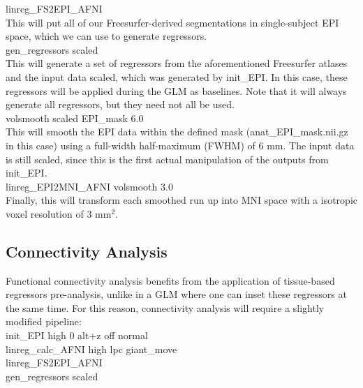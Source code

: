 \documentclass[final,titlepage,letterpaper,oneside,12pt]{article}
\renewcommand{\texttt}[2][BrickRed]{\textcolor{#1}{\ttfamily #2}}%
\begin{document}
\noindent
\texttt{linreg\_FS2EPI\_AFNI} \\

This will put all of our Freesurfer-derived segmentations in single-subject EPI space, which we can use to generate regressors. \\

\noindent
\texttt{gen\_regressors scaled} \\

This will generate a set of regressors from the aforementioned Freesurfer atlases and the input data \texttt{scaled}, which was generated by \texttt{init\_EPI}. In this case, these regressors will be applied during the GLM as baselines. Note that it will always generate all regressors, but they need not all be used. \\

\noindent
\texttt{volsmooth scaled EPI\_mask 6.0} \\

This will smooth the EPI data within the defined mask (\texttt{anat\_EPI\_mask.nii.gz} in this case) using a full-width half-maximum (FWHM) of 6 mm. The input data is still scaled, since this is the first actual manipulation of the outputs from \texttt{init\_EPI}. \\

\noindent
\texttt{linreg\_EPI2MNI\_AFNI volsmooth 3.0} \\

Finally, this will transform each smoothed run up into MNI space with a isotropic voxel resolution of 3 mm$^2$. \\


\subsection{Connectivity Analysis}

Functional connectivity analysis benefits from the application of tissue-based regressors pre-analysis, unlike in a GLM where one can inset these regressors at the same time. For this reason, connectivity analysis will require a slightly modified pipeline: \\

\noindent
\texttt{init\_EPI high 0 alt+z off normal} \\
\texttt{linreg\_calc\_AFNI high lpc giant\_move} \\
\texttt{linreg\_FS2EPI\_AFNI} \\
\texttt{gen\_regressors scaled} \\
\end{document}
